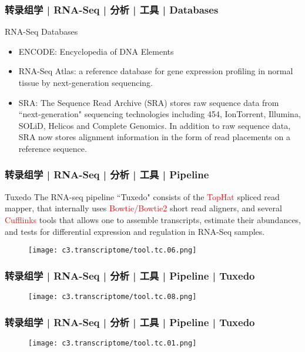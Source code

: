 \begin{frame}
  \frametitle{转录组学 | RNA-Seq | 分析 | 工具 | Databases}
  \begin{block}{RNA-Seq Databases}
    \begin{itemize}
      \item ENCODE: Encyclopedia of DNA Elements
      \item RNA-Seq Atlas: a reference database for gene expression profiling in normal tissue by next-generation sequencing.
      \item SRA: The Sequence Read Archive (SRA) stores raw sequence data from ``next-generation" sequencing technologies including 454, IonTorrent, Illumina, SOLiD, Helicos and Complete Genomics. In addition to raw sequence data, SRA now stores alignment information in the form of read placements on a reference sequence.
    \end{itemize}
  \end{block}
\end{frame}

\begin{frame}
  \frametitle{转录组学 | RNA-Seq | 分析 | 工具 | Pipeline}
  {\footnotesize
  \begin{block}{Tuxedo}
    The RNA-seq pipeline ``Tuxedo" consists of the \textcolor{red}{TopHat} spliced read mapper, that internally uses \textcolor{red}{Bowtie/Bowtie2} short read aligners, and several \textcolor{red}{Cufflinks} tools that allows one to assemble transcripts, estimate their abundances, and tests for differential expression and regulation in RNA-Seq samples.
  \end{block}
}
  \begin{figure}
    \centering
    \texttt{[image: c3.transcriptome/tool.tc.06.png]}
  \end{figure}
\end{frame}

\begin{frame}
  \frametitle{转录组学 | RNA-Seq | 分析 | 工具 | Pipeline | Tuxedo}
  \begin{figure}
    \centering
    \texttt{[image: c3.transcriptome/tool.tc.08.png]}
  \end{figure}
\end{frame}

\begin{frame}
  \frametitle{转录组学 | RNA-Seq | 分析 | 工具 | Pipeline | Tuxedo}
  \begin{figure}
    \centering
    \texttt{[image: c3.transcriptome/tool.tc.01.png]}
  \end{figure}
\end{frame}

